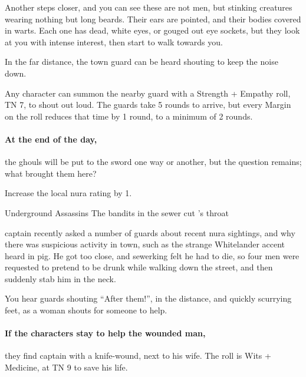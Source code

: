 \begin{multicols}{2}
\begin{boxtext}
	Another steps closer, and you can see these are not men, but stinking creatures wearing nothing but long beards.
	Their ears are pointed, and their bodies covered in warts.
	Each one has dead, white eyes, or gouged out eye sockets, but they look at you with intense interest, then start to walk towards you.

	In the far distance, the town guard can be heard shouting to keep the noise down.

\end{boxtext}

Any character can summon the nearby guard with a Strength + Empathy roll, TN 7, to shout out loud.
The guards take 5 rounds to arrive, but every Margin on the roll reduces that time by 1 round, to a minimum of 2 rounds.

\paragraph{At the end of the day,}
the ghouls will be put to the sword one way or another, but the question remains; what brought them here?


Increase the local nura rating by 1.

{\N Underground Assassins}%
{The bandits in the sewer cut 's throat}%

\Gls{captain} recently asked a number of guards about recent nura sightings, and why there was suspicious activity in town, such as the strange Whitelander accent heard in \gls{pig}.
He got too close, and \gls{sewerking} felt he had to die, so four men were requested to pretend to be drunk while walking down the street, and then suddenly stab him in the neck.

\begin{boxtext}

	You hear guards shouting ``After them!'', in the distance, and quickly scurrying feet, as a woman shouts for someone to help.

\end{boxtext}

\paragraph{If the characters stay to help the wounded man,}
they find \gls{captain} with a knife-wound, next to his wife.
The roll is Wits + Medicine, at TN 9 to save his life.


\end{multicols}
